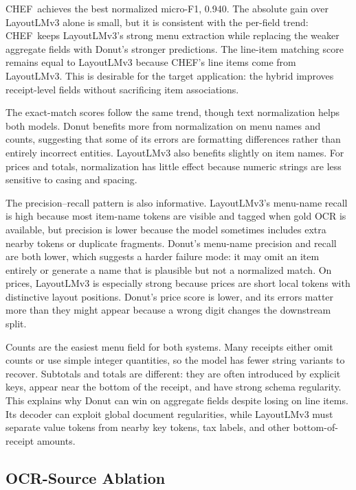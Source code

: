 \documentclass[9pt,twocolumn,twoside]{extarticle}
\newcommand{\chef}{\textsc{CHEF}}
\begin{document}
\chef\ achieves the best normalized micro-F1, 0.940. The absolute gain over LayoutLMv3 alone is small, but it is consistent with the per-field trend: \chef\ keeps LayoutLMv3's strong menu extraction while replacing the weaker aggregate fields with Donut's stronger predictions. The line-item matching score remains equal to LayoutLMv3 because \chef's line items come from LayoutLMv3. This is desirable for the target application: the hybrid improves receipt-level fields without sacrificing item associations.

The exact-match scores follow the same trend, though text normalization helps both models. Donut benefits more from normalization on menu names and counts, suggesting that some of its errors are formatting differences rather than entirely incorrect entities. LayoutLMv3 also benefits slightly on item names. For prices and totals, normalization has little effect because numeric strings are less sensitive to casing and spacing.

The precision--recall pattern is also informative. LayoutLMv3's menu-name recall is high because most item-name tokens are visible and tagged when gold OCR is available, but precision is lower because the model sometimes includes extra nearby tokens or duplicate fragments. Donut's menu-name precision and recall are both lower, which suggests a harder failure mode: it may omit an item entirely or generate a name that is plausible but not a normalized match. On prices, LayoutLMv3 is especially strong because prices are short local tokens with distinctive layout positions. Donut's price score is lower, and its errors matter more than they might appear because a wrong digit changes the downstream split.

Counts are the easiest menu field for both systems. Many receipts either omit counts or use simple integer quantities, so the model has fewer string variants to recover. Subtotals and totals are different: they are often introduced by explicit keys, appear near the bottom of the receipt, and have strong schema regularity. This explains why Donut can win on aggregate fields despite losing on line items. Its decoder can exploit global document regularities, while LayoutLMv3 must separate value tokens from nearby key tokens, tax labels, and other bottom-of-receipt amounts.

\subsection{OCR-Source Ablation}
\label{sec:ocr-ablation}
\end{document}
